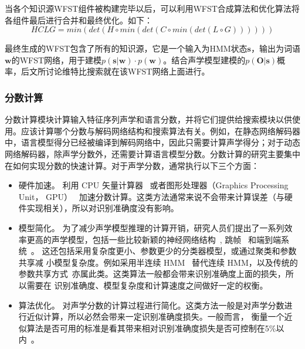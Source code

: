 当各个知识源WFST组件被构建完毕以后，可以利用WFST合成算法和优化算法将各组件最后进行合并和最终优化。如下：
\begin{equation}
HCLG = min(det(H \circ min(det(C \circ min(det(L \circ G))))))
\end{equation}

最终生成的WFST包含了所有的知识源，它是一个输入为HMM状态$\mathbf{s}$，输出为词语$\mathbf{w}$的WFST网络，用于建模$p(\mathbf{s}|\mathbf{w})\cdot p(\mathbf{w})$。结合声学模型建模的$p(\mathbf{O}|\mathbf{s})$概率，后文所讨论维特比搜索就在该WFST网络上面进行。

\subsubsection{分数计算}
\label{chap:intro2-score}

分数计算模块计算输入特征序列声学和语言分数，并将它们提供给搜索模块以供使用。应该计算哪个分数与解码网络结构和搜索算法有关。例如，在静态网络解码器中，语言模型得分已经被编译到解码网络中，因此只需要计算声学得分；对于动态网络解码器，除声学分数外，还需要计算语言模型分数。分数计算的研究主要集中在如何实现分数的快速计算。对于声学分数，通常执行以下三个方面：

\begin{itemize}
\item 硬件加速。
%
利用 CPU 矢量计算器~\cite{kanthak2000using}
或者图形处理器（Graphics Processing Unit， GPU）~\cite{chong2009fully}
加速分数计算。这类方法通常来说不会带来计算误差（与硬件实现相关），所以对识别准确度没有影响。
\item 模型简化。
为了减少声学模型推理的计算开销，研究人员们提出了一系列效率更高的声学模型，包括一些比较新颖的神经网络结构~\cite{xue2014singular,peddinti2018low}, 跳帧~\cite{pundak2016lower,zhc00-chen-is16,zhc00-chen-tasl2017}
和端到端系统~\cite{audhkhasi2017direct,e2e-2018}。
这还包括采用复杂度更小、参数更少的分类器模型，或通过聚类和参数共享减
小模型复杂度。例如采用半连续 HMM~\cite{huang1990semi} 替代连续 HMM，以及传统的参数共享方式~\cite{young2002htk}亦属此类。这类算法一般都会带来识别准确度上面的损失，所以需要在
识别准确度、模型复杂度和计算速度之间做好一定的权衡。
\item 算法优化。 对声学分数的计算过程进行简化。这类方法一般是对声学分数进行近似计算，所以必然会带来一定识别准确度损失。一般而言， 衡量一个近似算法是否可用的标准是看其带来相对识别准确度损失是否可控制在5\%以内~\cite{cai2009efficient}。
\end{itemize}

